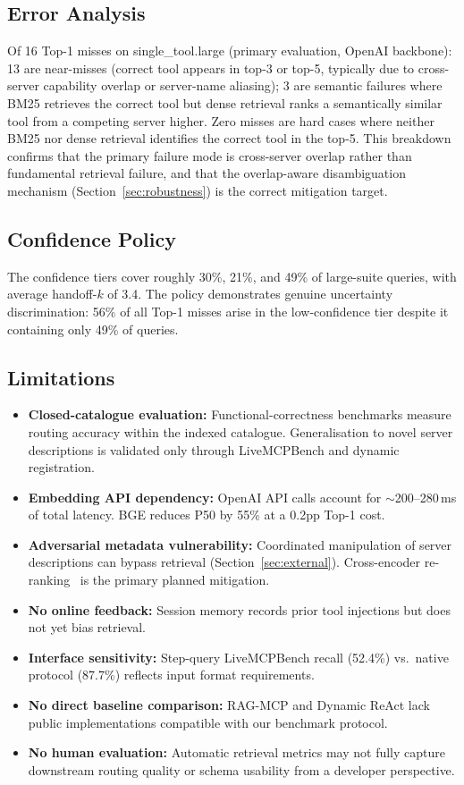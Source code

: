 \documentclass[sigconf,anonymous,review]{acmart}
\begin{document}
\subsection{Error Analysis}
Of 16 Top-1 misses on single\_tool.large (primary evaluation, OpenAI backbone):
13 are near-misses (correct tool appears in top-3 or top-5, typically due to
cross-server capability overlap or server-name aliasing);
3 are semantic failures where BM25 retrieves the correct tool but dense retrieval
ranks a semantically similar tool from a competing server higher.
Zero misses are hard cases where neither BM25 nor dense retrieval identifies the
correct tool in the top-5.
This breakdown confirms that the primary failure mode is cross-server overlap
rather than fundamental retrieval failure, and that the overlap-aware disambiguation
mechanism (Section~\ref{sec:robustness}) is the correct mitigation target.

\subsection{Confidence Policy}
The confidence tiers cover roughly 30\%, 21\%, and 49\% of large-suite queries,
with average handoff-$k$ of 3.4.
The policy demonstrates genuine uncertainty discrimination: 56\% of all Top-1 misses
arise in the low-confidence tier despite it containing only 49\% of queries.

\subsection{Limitations}
\begin{itemize}
\item \textbf{Closed-catalogue evaluation:} Functional-correctness benchmarks
  measure routing accuracy within the indexed catalogue. Generalisation to novel
  server descriptions is validated only through LiveMCPBench and dynamic
  registration.
\item \textbf{Embedding API dependency:} OpenAI API calls account for
  $\sim$200--280\,ms of total latency. BGE reduces P50 by 55\% at a 0.2pp Top-1
  cost.
\item \textbf{Adversarial metadata vulnerability:} Coordinated manipulation of
  server descriptions can bypass retrieval (Section~\ref{sec:external}).
  Cross-encoder re-ranking~\cite{nogueira2019bert} is the primary planned
  mitigation.
\item \textbf{No online feedback:} Session memory records prior tool injections but
  does not yet bias retrieval.
\item \textbf{Interface sensitivity:} Step-query LiveMCPBench recall (52.4\%)
  vs.\ native protocol (87.7\%) reflects input format requirements.
\item \textbf{No direct baseline comparison:} RAG-MCP and Dynamic ReAct lack public
  implementations compatible with our benchmark protocol.
\item \textbf{No human evaluation:} Automatic retrieval metrics may not fully
  capture downstream routing quality or schema usability from a developer
  perspective.
\end{itemize}
\end{document}
